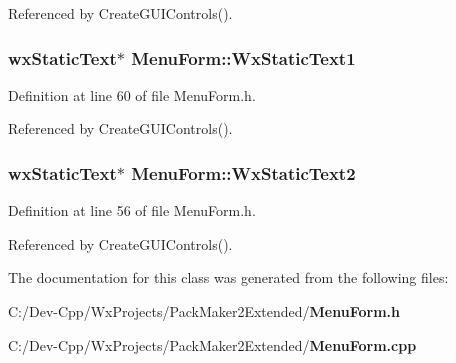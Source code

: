 Referenced by Create\-GUIControls().
\subsubsection{\setlength{\rightskip}{0pt plus 5cm}wx\-Static\-Text$\ast$ {\bf Menu\-Form::Wx\-Static\-Text1}}\label{class_menu_form_f68426089654dbf544d40ea9fa708a28}




Definition at line 60 of file Menu\-Form.h.

Referenced by Create\-GUIControls().
\subsubsection{\setlength{\rightskip}{0pt plus 5cm}wx\-Static\-Text$\ast$ {\bf Menu\-Form::Wx\-Static\-Text2}}\label{class_menu_form_c9b738197de0673505e57c0c230c781e}




Definition at line 56 of file Menu\-Form.h.

Referenced by Create\-GUIControls().

The documentation for this class was generated from the following files:\begin{CompactItemize}
\item 
C:/Dev-Cpp/Wx\-Projects/Pack\-Maker2Extended/{\bf Menu\-Form.h}\item 
C:/Dev-Cpp/Wx\-Projects/Pack\-Maker2Extended/{\bf Menu\-Form.cpp}\end{CompactItemize}

